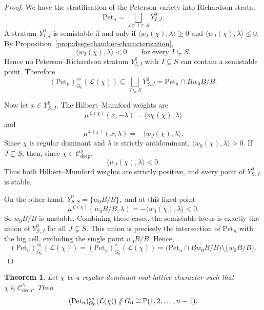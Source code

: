 \documentclass[12pt, reqno]{amsart}
\newcommand{\sslash}{\mathbin{/\mkern-6mu/}}
\theoremstyle{plain}
\numberwithin{equation}{section}
\newtheorem{theorem}{Theorem}[section]
\theoremstyle{definition}
\begin{document}
\begin{proof}
We have the stratification of the Peterson variety into Richardson strata:
\[ \mathrm{Pet}_{n} = \bigsqcup_{J \subseteq I \subseteq S} Y^{0}_{I,J}. \]
A stratum $Y^{0}_{I,J}$ is semistable if and only if $\langle w_{I}(\chi), \lambda \rangle \geq 0$ and $\langle w_{J}(\chi), \lambda \rangle \leq 0$. By Proposition~\ref{prop:deep-chamber-characterization},
\[
\langle w_I(\chi),\lambda\rangle<0
\qquad
\text{for every }I\subsetneq S.
\]
Hence no Peterson--Richardson stratum \(Y^0_{I,J}\) with
\(I\subsetneq S\) can contain a semistable point. 
Therefore
\[
(\mathrm{Pet}_n)^{ss}_{G_0}(\mathcal L(\chi))
\subseteq
\bigsqcup_{J\subseteq S}Y^0_{S,J}
=
\mathrm{Pet}_n\cap Bw_0B/B.
\]

Now let \(x\in Y^0_{S,J}\). The Hilbert--Mumford weights are
\[
\mu^{\mathcal L(\chi)}(x,-\lambda)
=
\langle w_0(\chi),\lambda\rangle
\]
and
\[
\mu^{\mathcal L(\chi)}(x,\lambda)
=
-\langle w_J(\chi),\lambda\rangle.
\]
Since \(\chi\) is regular dominant and \(\lambda\) is strictly
antidominant, $\langle w_0(\chi),\lambda\rangle>0.$ If \(J\subsetneq S\), then, since
\(\chi\in\mathcal C_{\mathrm{deep}}^\lambda\),
\[
\langle w_J(\chi),\lambda\rangle<0.
\]
Thus both Hilbert--Mumford weights are strictly positive, and every
point of \(Y^0_{S,J}\) is stable.

On the other hand, $Y^0_{S,S}=\{w_0B/B\},$ and at this fixed point
\[
\mu^{\mathcal L(\chi)}(w_0B/B,\lambda)
=
-\langle w_0(\chi),\lambda\rangle<0.
\]
So \(w_0B/B\) is unstable. Combining these cases, the semistable locus is exactly the union of $Y^0_{S,J}$ for all $J \subsetneq S$. This union is precisely the intersection of $\mathrm{Pet}_n$ with the big cell, excluding the single point $w_0B/B$. Hence,
\[
(\mathrm{Pet}_n)^{ss}_{G_0}(\mathcal L(\chi))
=
(\mathrm{Pet}_n)^s_{G_0}(\mathcal L(\chi))
=
\bigl(\mathrm{Pet}_n\cap Bw_0B/B\bigr)
\setminus\{w_0B/B\}.
\]
\end{proof}

\begin{theorem}\label{thm:deep-quotient}
Let \(\chi\) be a regular dominant root-lattice character such that $\chi\in\mathcal C_{\mathrm{deep}}^\lambda.$
Then
\[
(\mathrm{Pet}_n)^{ss}_{G_0}(\mathcal L(\chi))
\sslash G_0
\cong
\mathbb P(1,2,\ldots,n-1).
\]
\end{theorem}
\end{document}
